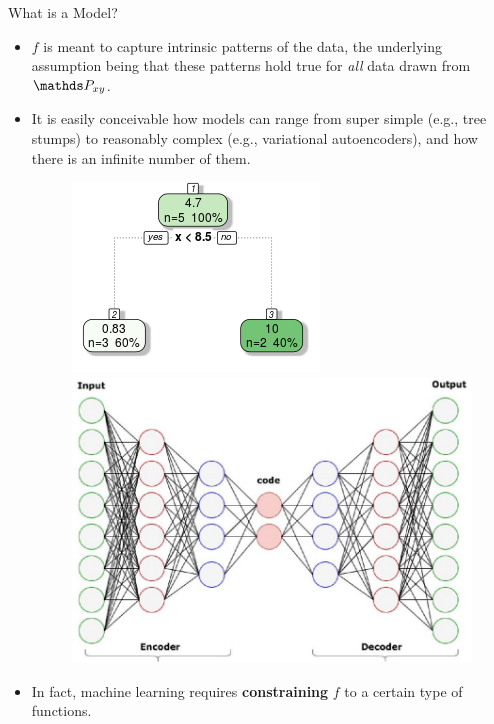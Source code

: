 \documentclass[11pt,compress,t,notes=noshow, xcolor=table]{beamer}
\begin{document}
\begin{vbframe}{What is a Model?}
\begin{itemize}

  \item $f$ is meant to capture intrinsic patterns of the data, the
  underlying assumption being that these patterns hold true for \emph{all} data 
  drawn from $\Pxy$.
  
  \item It is easily conceivable how models can range from super simple (e.g.,
  tree stumps) to reasonably complex (e.g., variational autoencoders), and how 
  there is an infinite number of them.
  
  \begin{figure}
  \begin{minipage}{.4\textwidth}
    \centering
    \includegraphics[width=0.6\linewidth]{figure_man/monotone_trafo1.png}
  \end{minipage}%
  \begin{minipage}{.6\textwidth}
    \centering
    \includegraphics[width=0.6\linewidth]{figure_man/stacked_autoencoder.png}
  \end{minipage}
  \end{figure}
  
  \vspace{0.2cm}
  
  \item In fact, machine learning requires \textbf{constraining} $f$ to a 
  certain type of functions.

\end{itemize}

\end{vbframe}
\end{document}
